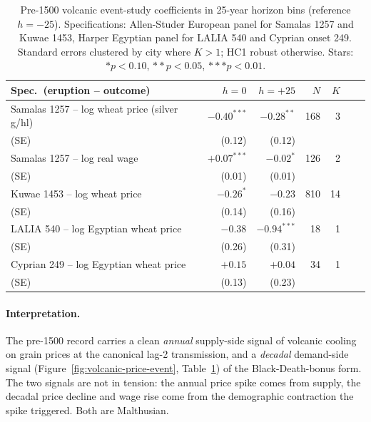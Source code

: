 \documentclass[11pt,letterpaper]{article}
\begin{document}
\begin{table}[H]
\centering
\caption{Pre-1500 volcanic event-study coefficients in 25-year horizon bins (reference $h=-25$). Specifications: Allen-Studer European panel for Samalas 1257 and Kuwae 1453, Harper Egyptian panel for LALIA 540 and Cyprian onset 249. Standard errors clustered by city where $K>1$; HC1 robust otherwise. Stars: $* p<0.10$, $** p<0.05$, $*** p<0.01$.}
\label{tab:volcanic-pre1500}
\small
\begin{tabular}{lrrrrrr}
\toprule
Spec.\ (eruption -- outcome) & $h=0$ & $h=+25$ & $N$ & $K$ \\
\midrule
Samalas 1257 -- log wheat price (silver g/hl) & $-0.40^{***}$ & $-0.28^{**}$ & 168 & 3 \\
\hspace{1em} (SE) & (0.12) & (0.12) & & \\
Samalas 1257 -- log real wage & $+0.07^{***}$ & $-0.02^{*}$ & 126 & 2 \\
\hspace{1em} (SE) & (0.01) & (0.01) & & \\
Kuwae 1453 -- log wheat price & $-0.26^{*}$ & $-0.23$ & 810 & 14 \\
\hspace{1em} (SE) & (0.14) & (0.16) & & \\
LALIA 540 -- log Egyptian wheat price & $-0.38$ & $-0.94^{***}$ & 18 & 1 \\
\hspace{1em} (SE) & (0.26) & (0.31) & & \\
Cyprian 249 -- log Egyptian wheat price & $+0.15$ & $+0.04$ & 34 & 1 \\
\hspace{1em} (SE) & (0.13) & (0.23) & & \\
\bottomrule
\end{tabular}
\end{table}

\paragraph{Interpretation.} The pre-1500 record carries a clean \emph{annual} supply-side signal of volcanic cooling on grain prices at the canonical lag-2 transmission, and a \emph{decadal} demand-side signal (Figure~\ref{fig:volcanic-price-event}, Table~\ref{tab:volcanic-pre1500}) of the Black-Death-bonus form. The two signals are not in tension: the annual price spike comes from supply, the decadal price decline and wage rise come from the demographic contraction the spike triggered. Both are Malthusian.
\end{document}
